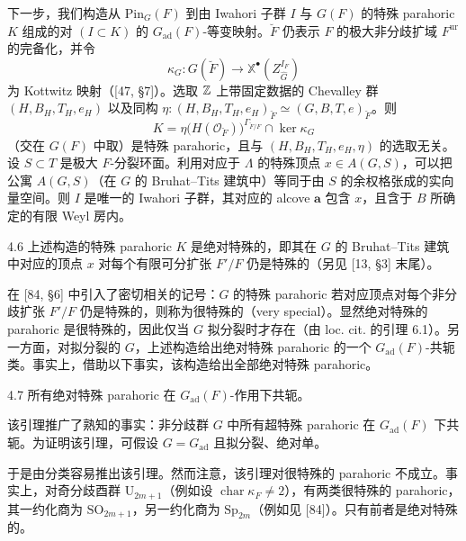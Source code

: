下一步，我们构造从 $\mathrm{Pin}_G(F)$ 到由 Iwahori 子群 $I$ 与 $G(F)$ 的特殊 parahoric $K$ 组成的对 $(I\subset K)$ 的 $G_{\mathrm{ad}}(F)$-等变映射。$\breve F$ 仍表示 $F$ 的极大非分歧扩域 $F^{\mathrm{ur}}$ 的完备化，并令
\begin{equation}
\tag{4.6}
\kappa_G:G(\breve F)\to\mathbb{X}^\bullet(Z_{\hat G}^{I_F})
\end{equation}
为 Kottwitz 映射（[47, §7]）。选取 $\mathbb{Z}$ 上带固定数据的 Chevalley 群 $(H,B_H,T_H,e_H)$ 以及同构
$\eta:(H,B_H,T_H,e_H)_{\breve F}\simeq(G,B,T,e)_{\breve F}$。则
\[
K=\eta\big(H(\mathcal{O}_{\breve F})\big)^{\Gamma_{\breve F/F}}\cap\ker\kappa_G
\]
（交在 $G(F)$ 中取）是特殊 parahoric，且与 $(H,B_H,T_H,e_H,\eta)$ 的选取无关。设 $S\subset T$ 是极大 $F$-分裂环面。利用对应于 $\Lambda$ 的特殊顶点 $x\in A(G,S)$，可以把公寓 $A(G,S)$（在 $G$ 的 Bruhat–Tits 建筑中）等同于由 $S$ 的余权格张成的实向量空间。则 $I$ 是唯一的 Iwahori 子群，其对应的 alcove $\mathbf{a}$ 包含 $x$，且含于 $B$ 所确定的有限 Weyl 房内。

\begin{rem}{4.6}
上述构造的特殊 parahoric $K$ 是绝对特殊的，即其在 $G$ 的 Bruhat–Tits 建筑中对应的顶点 $x$ 对每个有限可分扩张 $F'/F$ 仍是特殊的（另见 [13, §3] 末尾）。

在 [84, §6] 中引入了密切相关的记号：$G$ 的特殊 parahoric 若对应顶点对每个非分歧扩张 $F'/F$ 仍是特殊的，则称为很特殊的（very special）。显然绝对特殊的 parahoric 是很特殊的，因此仅当 $G$ 拟分裂时才存在（由 loc. cit. 的引理 6.1）。另一方面，对拟分裂的 $G$，上述构造给出绝对特殊 parahoric 的一个 $G_{\mathrm{ad}}(F)$-共轭类。事实上，借助以下事实，该构造给出全部绝对特殊 parahoric。
\end{rem}

\begin{lem}{4.7}
所有绝对特殊 parahoric 在 $G_{\mathrm{ad}}(F)$-作用下共轭。
\end{lem}

该引理推广了熟知的事实：非分歧群 $G$ 中所有超特殊 parahoric 在 $G_{\mathrm{ad}}(F)$ 下共轭。为证明该引理，可假设 $G=G_{\mathrm{ad}}$ 且拟分裂、绝对单。

于是由分类容易推出该引理。然而注意，该引理对很特殊的 parahoric 不成立。事实上，对奇分歧酉群 $\mathrm{U}_{2m+1}$（例如设 $\operatorname{char}\kappa_F\neq2$），有两类很特殊的 parahoric，其一约化商为 $\mathrm{SO}_{2m+1}$，另一约化商为 $\mathrm{Sp}_{2m}$（例如见 [84]）。只有前者是绝对特殊的。

